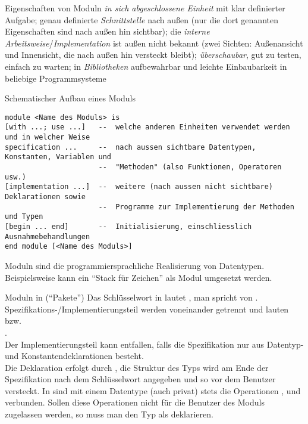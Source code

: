 \begin{Def}{Eigenschaften von Moduln}
    \emph{in sich abgeschlossene Einheit} mit klar definierter Aufgabe;
    genau definierte \emph{Schnittstelle} nach außen (nur die dort
    genannten Eigenschaften sind nach außen hin sichtbar);
    die \emph{interne Arbeitsweise}/\emph{Implementation} ist außen nicht
    bekannt (zwei Sichten: Außenansicht und Innensicht, die nach außen hin
    versteckt bleibt);
    \emph{überschaubar}, gut zu testen, einfach zu warten;
    in \emph{Bibliotheken} aufbewahrbar und leichte Einbaubarkeit in
    beliebige Programmsysteme
\end{Def}

\begin{Def}{Schematischer Aufbau eines Moduls}
\begin{lstlisting}[language=pseudosprache]
module <Name des Moduls> is
[with ...; use ...]   --  welche anderen Einheiten verwendet werden und in welcher Weise
specification ...     --  nach aussen sichtbare Datentypen, Konstanten, Variablen und
                      --  "Methoden" (also Funktionen, Operatoren usw.)
[implementation ...]  --  weitere (nach aussen nicht sichtbare) Deklarationen sowie
                      --  Programme zur Implementierung der Methoden und Typen
[begin ... end]       --  Initialisierung, einschliesslich Ausnahmebehandlungen
end module [<Name des Moduls>]
\end{lstlisting}
    \vspace{-10pt}
    Moduln sind die programmiersprachliche Realisierung von Datentypen.
    Beispielsweise kann ein "`Stack für Zeichen"' als Modul umgesetzt werden.
\end{Def}

\begin{Def}{Moduln in \Ada{} ("`Pakete"')}
    Das Schlüsselwort in \Ada{} lautet , man spricht von
    .
    Spezifikations-/Implementierungsteil werden voneinander
    getrennt und lauten \\
    bzw. \\
    . \\
    Der Implementierungsteil kann entfallen, falls die Spezifikation nur
    aus Datentyp- und Konstantendeklarationen besteht. \\
    Die Deklaration  erfolgt durch
    , die Struktur des Typs wird
    am Ende der Spezifikation nach dem Schlüsselwort 
    angegeben und so vor dem Benutzer versteckt.
    In \Ada{} sind mit einem Datentype (auch privat) stets die Operationen
    \adacode{=}, \adacode{/=} und \adacode{:=} verbunden.
    Sollen diese Operationen nicht für die Benutzer des Moduls zugelassen
    werden, so muss man den Typ als  deklarieren.
\end{Def}

